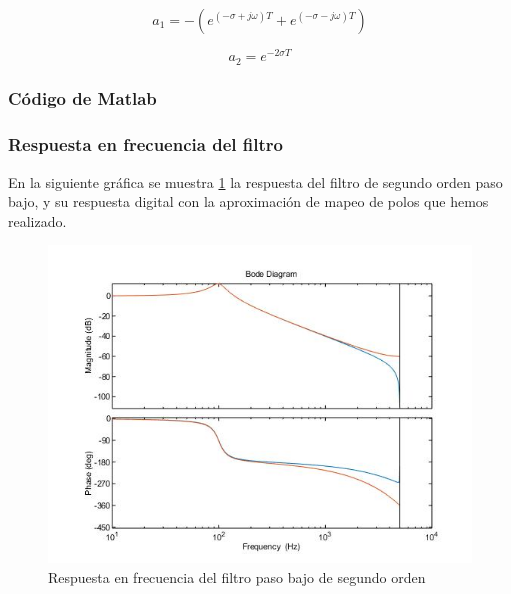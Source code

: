 \documentclass[titlepage]{article}
\begin{document}
	\begin{equation}
		a_1=-(e^{(-\sigma+j\omega)T}+e^{(-\sigma-j\omega)T})
	\end{equation}

	\begin{equation}
		a_2=e^{-2{\sigma}T}
	\end{equation}

\subsubsection{Código de Matlab}

\subsubsection{Respuesta en frecuencia del filtro}
En la siguiente gráfica se muestra \ref{fig:lowpassdiscrete} la respuesta del filtro de segundo orden paso bajo, y su respuesta digital con la aproximación de mapeo de polos que hemos realizado. 
\begin{figure}[H]
  \centering
	\includegraphics[scale=0.5]{lowpassdiscrete}
  \caption{Respuesta en frecuencia del filtro paso bajo de segundo orden}
  \label{fig:lowpassdiscrete}
\end{figure}
\end{document}
